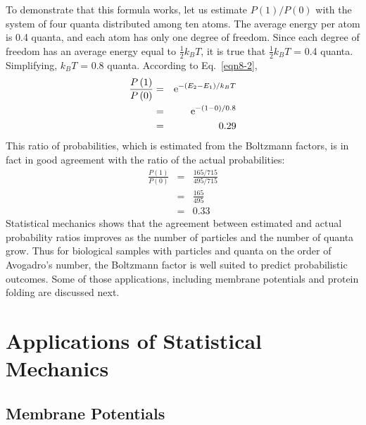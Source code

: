 To demonstrate that this formula works, let us estimate $P(1)/P(0)$ with the system of four quanta distributed among ten atoms.  The average energy per atom is 0.4 quanta, and each atom has only one degree of freedom.  Since each degree of freedom has an average energy equal to $\frac{1}{2}k_BT$, it is true that $\frac{1}{2}k_BT$ = 0.4 quanta.  Simplifying, $k_BT$ = 0.8 quanta.  According to Eq.~\ref{eqn8-2}, 
\begin{eqnarray}
\frac{P\left(1\right)}{P\left(0\right)} &=& {\rm e}^{-\left(E_2-E_1\right)/k_BT}\nonumber\\
&=&  {\rm e}^{-\left(1-0\right)/0.8}\nonumber\\
&=& 0.29\nonumber
\end{eqnarray}
This ratio of probabilities, which is estimated from the Boltzmann factors, is in fact in good agreement with the ratio of the actual probabilities:
\begin{eqnarray}
\frac{P\left(1\right)}{P\left(0\right)} &=& \frac{165/715}{495/715}\nonumber\\
&=&  \frac{165}{495}\nonumber\\
&=& 0.33\nonumber
\end{eqnarray}
Statistical mechanics shows that the agreement between estimated and actual probability ratios improves as the number of particles and the number of quanta grow.  Thus for biological samples with particles and quanta on the order of Avogadro's number, the Boltzmann factor is well suited to predict probabilistic outcomes.  Some of those applications, including membrane potentials and protein folding are discussed next.  

\section{Applications of Statistical Mechanics}

\subsection{Membrane Potentials}

